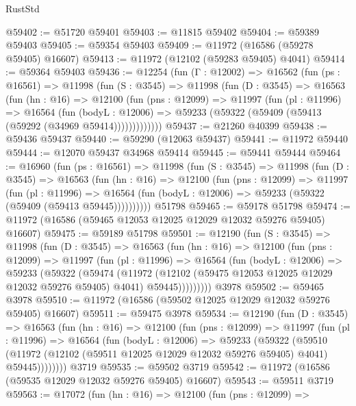 \begin{lexlean}{RustStd}
\begin{coremodule}
@59402 := @51720 @59401
@59403 := @11815 @59402
@59404 := @59389 @59403
@59405 := @59354 @59403
@59409 := @11972 (@16586 (@59278 @59405) @16607)
@59413 := @11972 (@12102 (@59283 @59405) @4041)
@59414 := @59364 @59403
@59436 := @12254
    (fun (Γ : @12002) =>
    @16562
      (fun (ps : @16561) =>
      @11998
        (fun (S : @3545) =>
        @11998
          (fun (D : @3545) =>
          @16563
            (fun (hn : @16) =>
            @12100
              (fun (pns : @12099) =>
              @11997
                (fun (pl : @11996) =>
                @16564
                  (fun (bodyL : @12006) =>
                  @59233 (@59322 (@59409 (@59413 (@59292 (@34969 @59414)))))))))))))
@59437 := @21260 @40399
@59438 := @59436 @59437
@59440 := @59290 (@12063 @59437)
@59441 := @11972 @59440
@59444 := @12070 @59437 @34968 @59414
@59445 := @59441 @59444
@59464 := @16960
    (fun (ps : @16561) =>
    @11998
      (fun (S : @3545) =>
      @11998
        (fun (D : @3545) =>
        @16563
          (fun (hn : @16) =>
          @12100
            (fun (pns : @12099) =>
            @11997
              (fun (pl : @11996) =>
              @16564 (fun (bodyL : @12006) => @59233 (@59322 (@59409 (@59413 @59445))))))))))
    @51798
@59465 := @59178 @51798
@59474 := @11972 (@16586 (@59465 @12053 @12025 @12029 @12032 @59276 @59405) @16607)
@59475 := @59189 @51798
@59501 := @12190
    (fun (S : @3545) =>
    @11998
      (fun (D : @3545) =>
      @16563
        (fun (hn : @16) =>
        @12100
          (fun (pns : @12099) =>
          @11997
            (fun (pl : @11996) =>
            @16564
              (fun (bodyL : @12006) =>
              @59233
                (@59322
                  (@59474
                    (@11972
                      (@12102 (@59475 @12053 @12025 @12029 @12032 @59276 @59405) @4041)
                      @59445)))))))))
    @3978
@59502 := @59465 @3978
@59510 := @11972 (@16586 (@59502 @12025 @12029 @12032 @59276 @59405) @16607)
@59511 := @59475 @3978
@59534 := @12190
    (fun (D : @3545) =>
    @16563
      (fun (hn : @16) =>
      @12100
        (fun (pns : @12099) =>
        @11997
          (fun (pl : @11996) =>
          @16564
            (fun (bodyL : @12006) =>
            @59233
              (@59322
                (@59510
                  (@11972 (@12102 (@59511 @12025 @12029 @12032 @59276 @59405) @4041) @59445))))))))
    @3719
@59535 := @59502 @3719
@59542 := @11972 (@16586 (@59535 @12029 @12032 @59276 @59405) @16607)
@59543 := @59511 @3719
@59563 := @17072
    (fun (hn : @16) =>
    @12100
      (fun (pns : @12099) =>

\end{coremodule}
\end{lexlean}
